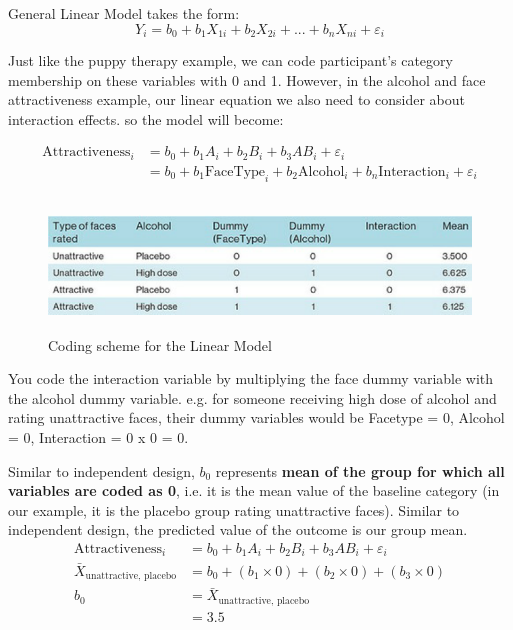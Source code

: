 \documentclass[a4paper, 12pt]{book}
\begin{document}
General Linear Model takes the form:
\begin{equation}
Y_i = b_0 + b_1X_{1i} + b_2X_{2i} + ...+ b_nX_{ni} + \varepsilon_i
\end{equation}

Just like the puppy therapy example, we can code participant's category membership on these variables with 0 and 1. 
However, in the alcohol and face attractiveness example, our linear equation we also need to consider about interaction effects. so the model will become:

\begin{equation}
\begin{split}
\text{Attractiveness}_i & = b_0 + b_1A_{i} + b_2B_{i} + b_3AB_{i} + \varepsilon_i \\
& = b_0 + b_1\text{FaceType}_{i} + b_2\text{Alcohol}_{i} + b_n\text{Interaction}_{i} + \varepsilon_i
\end{split}
\end{equation}

\begin{figure}[h]
	\includegraphics[width=1\textwidth,height=35mm]{Chapter 14 GLM 3 Factorial Designs/codingscheme.PNG}
	\caption{Coding scheme for the Linear Model}
\end{figure}

You code the interaction variable by multiplying the face dummy variable with the alcohol dummy variable. e.g. for someone receiving high dose of alcohol and rating unattractive faces, their dummy variables would be Facetype = 0, Alcohol = 0, Interaction = 0 x 0 = 0.

Similar to independent design,  $b_0$ represents \textbf{mean of the group for which all variables are coded as 0}, i.e. it is the mean value of the baseline category (in our example, it is the placebo group rating unattractive faces).
Similar to independent design, the predicted value of the outcome is our group mean.
\begin{equation}
\begin{split}
\text{Attractiveness}_i & = b_0 + b_1A_{i} + b_2B_{i} + b_3AB_{i} + \varepsilon_i \\
\bar{X}_{\text{unattractive, placebo}} & = b_0 + (b_1 \times 0) + (b_2 \times 0) + (b_3 \times 0) \\
b_0 & = \bar{X}_{\text{unattractive, placebo}} \\
& = 3.5
\end{split}
\end{equation}
\end{document}
